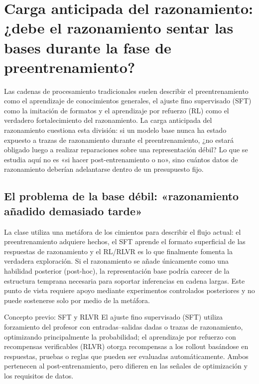 \section{Carga anticipada del razonamiento: ¿debe el razonamiento sentar las bases durante la fase de preentrenamiento?}

Las cadenas de procesamiento tradicionales suelen describir el preentrenamiento como el aprendizaje de conocimientos generales, el ajuste fino supervisado (SFT) como la imitación de formatos y el aprendizaje por refuerzo (RL) como el verdadero fortalecimiento del razonamiento. La carga anticipada del razonamiento cuestiona esta división: si un modelo base nunca ha estado expuesto a trazas de razonamiento durante el preentrenamiento, ¿no estará obligado luego a realizar reparaciones sobre una representación débil? Lo que se estudia aquí no es «si hacer post-entrenamiento o no», sino cuántos datos de razonamiento deberían adelantarse dentro de un presupuesto fijo.

\subsection{El problema de la base débil: «razonamiento añadido demasiado tarde»}

La clase utiliza una metáfora de los cimientos para describir el flujo actual: el preentrenamiento adquiere hechos, el SFT aprende el formato superficial de las respuestas de razonamiento y el RL/RLVR es lo que finalmente fomenta la verdadera exploración. Si el razonamiento se añade únicamente como una habilidad posterior (post-hoc), la representación base podría carecer de la estructura temprana necesaria para soportar inferencias en cadena largas. Este punto de vista requiere apoyo mediante experimentos controlados posteriores y no puede sostenerse solo por medio de la metáfora.


\begin{knowledgebox}{Concepto previo: SFT y RLVR}
El ajuste fino supervisado (SFT) utiliza forzamiento del profesor con entradas--salidas dadas o trazas de razonamiento, optimizando principalmente la probabilidad; el aprendizaje por refuerzo con recompensas verificables (RLVR) otorga recompensas a los rollout basándose en respuestas, pruebas o reglas que pueden ser evaluadas automáticamente. Ambos pertenecen al post-entrenamiento, pero difieren en las señales de optimización y los requisitos de datos.
\end{knowledgebox}

